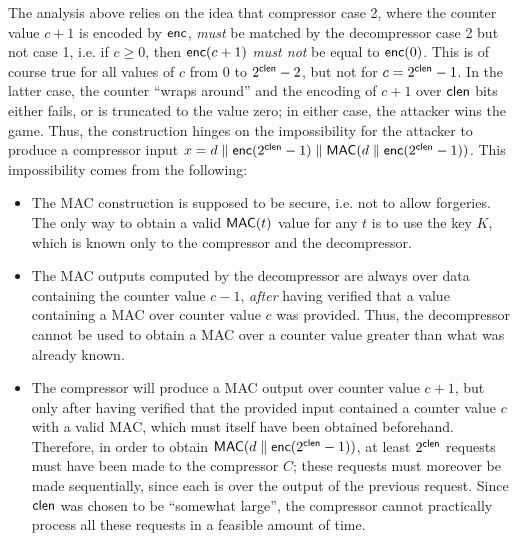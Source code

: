 \documentclass{llncs}
\newcommand{\MAC}{\text{\textsf{MAC}}}
\newcommand{\cc}{\text{\textsf{enc}}}
\newcommand{\cclen}{\text{\textsf{clen}}}
\begin{document}
The analysis above relies on the idea that compressor case 2, where the
counter value $c+1$ is encoded by $\cc$, \emph{must} be matched by the
decompressor case 2 but not case 1, i.e. if $c \geq 0$, then $\cc(c+1)$
\emph{must not} be equal to $\cc(0)$. This is of course true for all
values of $c$ from $0$ to $2^{\cclen}-2$, but not for $c = 2^{\cclen}-1$.
In the latter case, the counter ``wraps around'' and the encoding of
$c+1$ over $\cclen$ bits either fails, or is truncated to the value
zero; in either case, the attacker wins the game. Thus, the construction
hinges on the impossibility for the attacker to produce a compressor
input $x = d \parallel \cc(2^{\cclen} - 1) \parallel \MAC(d \parallel
\cc(2^{\cclen} - 1))$. This impossibility comes from the following:
\begin{itemize}

    \item The MAC construction is supposed to be secure, i.e. not to
    allow forgeries. The only way to obtain a valid $\MAC(t)$ value
    for any $t$ is to use the key $K$, which is known only to the
    compressor and the decompressor.

    \item The MAC outputs computed by the decompressor are always over
    data containing the counter value $c-1$, \emph{after} having
    verified that a value containing a MAC over counter value $c$ was
    provided. Thus, the decompressor cannot be used to obtain a MAC over
    a counter value greater than what was already known.

    \item The compressor will produce a MAC output over counter value
    $c+1$, but only after having verified that the provided input
    contained a counter value $c$ with a valid MAC, which must itself
    have been obtained beforehand. Therefore, in order to obtain $\MAC(d
    \parallel \cc(2^{\cclen} - 1))$, at least $2^{\cclen}$ requests must
    have been made to the compressor $C$; these requests must moreover
    be made sequentially, since each is over the output of the previous
    request. Since $\cclen$ was chosen to be ``somewhat large'', the
    compressor cannot practically process all these requests in a
    feasible amount of time.

\end{itemize}
\end{document}

